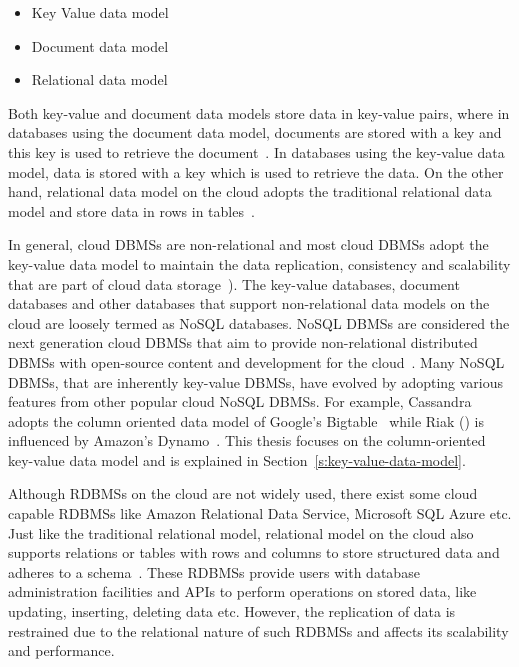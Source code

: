 \begin{itemize}
\item Key Value data model 

\item Document data model 

\item Relational data model
\end{itemize}

Both key-value and document data models store data in key-value pairs, where in
databases using the document data model, documents are stored with a key and
this key is used to retrieve the document~\citep{rahien}. In databases using the
key-value data model, data is stored with a key which is used to retrieve the
data. On the other hand, relational data model on the cloud adopts the
traditional relational data model and store data in rows in tables~\citep{azure}.

In general, cloud \acp{DBMS} are non-relational and most cloud \acp{DBMS} adopt
the key-value data model to maintain the data replication,   consistency and
scalability that are part of cloud data storage~\citep{Abadi,Stonebraker}). The
key-value databases, document databases and other databases that support
non-relational data models on the cloud are loosely termed as \ac{NoSQL}
databases.  \ac{NoSQL} \acp{DBMS} are considered the next generation cloud
\acp{DBMS} that aim to provide non-relational distributed \acp{DBMS} with
open-source content and development for the cloud~\citep{Stonebraker}. Many
\ac{NoSQL} \acp{DBMS}, that are inherently key-value \acp{DBMS},   have evolved
by adopting various features from other popular cloud \ac{NoSQL} \acp{DBMS}.
For example, Cassandra adopts the column oriented data model of Google's
Bigtable~\citep{bigtable} while Riak () is influenced by Amazon's
Dynamo~\citep{Dynamo}. This thesis focuses on the column-oriented key-value data
model and is explained in Section~\ref{s:key-value-data-model}.

Although \acp{RDBMS} on the cloud are not widely used,   there exist some cloud
capable \acp{RDBMS} like Amazon Relational Data Service,   Microsoft SQL Azure
etc.  Just like the traditional relational model,   relational model on the
cloud also supports relations or tables with rows and columns to store
structured data and adheres to a schema~\citep{campbell,azure}.  These
\acp{RDBMS} provide users with database administration facilities and \acp{API}
to perform operations on stored data,   like updating,   inserting,   deleting
data etc. However,   the replication of data is restrained due to the relational
nature of such \acp{RDBMS} and affects its scalability and performance.



